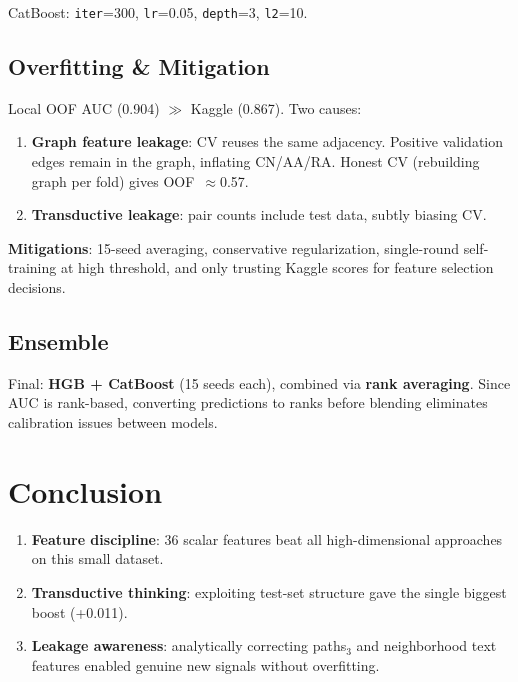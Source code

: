 \documentclass[10pt,a4paper,twocolumn]{article}
\begin{document}
CatBoost: \texttt{iter}=300, \texttt{lr}=0.05, \texttt{depth}=3, \texttt{l2}=10.

\subsection{Overfitting \& Mitigation}

Local OOF AUC (0.904) $\gg$ Kaggle (0.867). Two causes:
\begin{enumerate}
    \item \textbf{Graph feature leakage}: CV reuses the same adjacency. Positive validation edges remain in the graph, inflating CN/AA/RA. Honest CV (rebuilding graph per fold) gives OOF~$\approx$0.57.
    \item \textbf{Transductive leakage}: pair counts include test data, subtly biasing CV.
\end{enumerate}

\textbf{Mitigations}: 15-seed averaging, conservative regularization, single-round self-training at high threshold, and only trusting Kaggle scores for feature selection decisions.

\subsection{Ensemble}

Final: \textbf{HGB + CatBoost} (15 seeds each), combined via \textbf{rank averaging}. Since AUC is rank-based, converting predictions to ranks before blending eliminates calibration issues between models.

\section{Conclusion}

\begin{tcolorbox}[
  colback=mint!8, colframe=mint!70!black,
  arc=3pt, boxrule=0.6pt, left=4pt, right=4pt, top=3pt, bottom=3pt
]
\begin{enumerate}
    \item \textbf{Feature discipline}: 36 scalar features beat all high-dimensional approaches on this small dataset.
    \item \textbf{Transductive thinking}: exploiting test-set structure gave the single biggest boost (+0.011).
    \item \textbf{Leakage awareness}: analytically correcting paths$_3$ and neighborhood text features enabled genuine new signals without overfitting.
\end{enumerate}
\end{tcolorbox}
\end{document}
